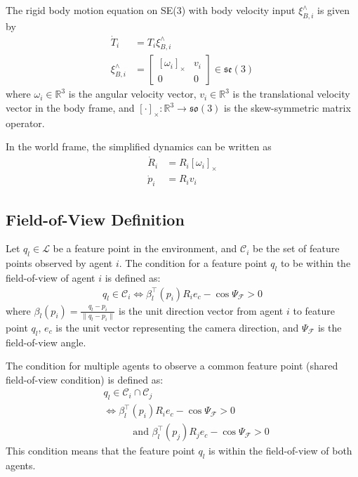 \documentclass[fleqn,10pt,twocolumn]{SICE_FES25}
\theoremstyle{definition}
\theoremstyle{plain}
\begin{document}
The rigid body motion equation on SE(3) with body velocity input $\xi^\wedge_{B,i}$ is given by
\begin{equation}
\begin{aligned}
\dot{T}_i &= T_i \xi^\wedge_{B,i} \\
\xi^\wedge_{B,i} &= \begin{bmatrix}
[\omega_i]_\times & v_{i} \\
0 & 0
\end{bmatrix} \in \mathfrak{se}(3)
\label{eq:se3_dynamics_body}
\end{aligned}
\end{equation}
where $\omega_i \in {\mathbb{R}}^3$ is the angular velocity vector, $v_{i} \in {\mathbb{R}}^3$ is the translational velocity vector in the body frame, and $[\cdot]_\times: {\mathbb{R}}^3 \rightarrow \mathfrak{so}(3)$ is the skew-symmetric matrix operator.

In the world frame, the simplified dynamics can be written as
\begin{equation}
\begin{aligned}
\dot{R}_i &= R_i[\omega_i]_\times \\
\dot{p}_i &= R_i v_i
\label{eq:se3_dynamics_simplified}
\end{aligned}
\end{equation}

\subsection{Field-of-View Definition}

Let $q_l \in \mathcal{L}$ be a feature point in the environment, and ${\mathcal{C}}_i$ be the set of feature points observed by agent $i$. The condition for a feature point $q_l$ to be within the field-of-view of agent $i$ is defined as:
\begin{equation}
\begin{aligned}
q_l \in {\mathcal{C}}_i \iff \beta_l^{\top}(p_i)R_ie_c - \cos\Psi_{\mathcal{F}} > 0
\label{eq:fov_condition}
\end{aligned}
\end{equation}
where $\beta_l(p_i) = \frac{q_l-p_i}{\|q_l-p_i\|}$ is the unit direction vector from agent $i$ to feature point $q_l$, $e_c$ is the unit vector representing the camera direction, and $\Psi_{\mathcal{F}}$ is the field-of-view angle.

The condition for multiple agents to observe a common feature point (shared field-of-view condition) is defined as:
\begin{equation}
\begin{aligned}
&q_l \in {{\mathcal{C}}}_i \cap {{\mathcal{C}}}_j \\
&\iff \beta_l^{\top}(p_i)R_ie_c - \cos\Psi_{\mathcal{F}} > 0 \\
&\:\:\:\qquad \text{ and } \beta_l^{\top}(p_j)R_je_c - \cos\Psi_{\mathcal{F}} > 0
\label{eq:shared_fov_condition}
\end{aligned}
\end{equation}
This condition means that the feature point $q_l$ is within the field-of-view of both agents.
\end{document}
